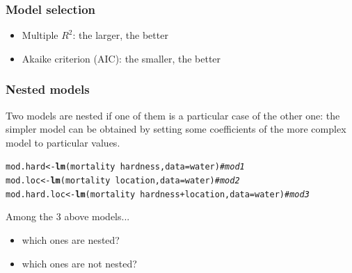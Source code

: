 \documentclass{beamer}\usepackage[]{graphicx}\usepackage[]{color}
\makeatletter
\newcommand{\hlcom}[1]{\textcolor[rgb]{0.678,0.584,0.686}{\textit{#1}}}%
\newcommand{\hlopt}[1]{\textcolor[rgb]{0,0,0}{#1}}%
\newcommand{\hlstd}[1]{\textcolor[rgb]{0.345,0.345,0.345}{#1}}%
\newcommand{\hlkwb}[1]{\textcolor[rgb]{0.69,0.353,0.396}{#1}}%
\newcommand{\hlkwc}[1]{\textcolor[rgb]{0.333,0.667,0.333}{#1}}%
\newcommand{\hlkwd}[1]{\textcolor[rgb]{0.737,0.353,0.396}{\textbf{#1}}}%
\newenvironment{kframe}{%
 \def\at@end@of@kframe{}%
 \ifinner\ifhmode%
  \def\at@end@of@kframe{\end{minipage}}%
  \begin{minipage}{\columnwidth}%
 \fi\fi%
 \def\FrameCommand##1{\hskip\@totalleftmargin \hskip-\fboxsep
 \colorbox{shadecolor}{##1}\hskip-\fboxsep
     \hskip-\linewidth \hskip-\@totalleftmargin \hskip\columnwidth}%
 \MakeFramed {\advance\hsize-\width
   \@totalleftmargin\z@ \linewidth\hsize
   \@setminipage}}%
 {\par\unskip\endMakeFramed%
 \at@end@of@kframe}
\newenvironment{knitrout}{}{} %
\makeatother
\begin{document}
{{{%

\begin{frame}[fragile]
\frametitle{Model selection}
\begin{itemize}
\item Multiple $R^2$: the larger, the better
\item Akaike criterion (AIC): the smaller, the better
\end{itemize}
\end{frame}


\begin{frame}[fragile]
\frametitle{Nested models}
Two models are nested if one of them is a particular case of the other one:
the simpler model can be obtained by setting some coefficients of the more complex
model to particular values.
\begin{knitrout}\scriptsize
{}\color{fgcolor}\begin{kframe}
\begin{alltt}
\hlstd{mod.hard} \hlkwb{<-} \hlkwd{lm}\hlstd{(mortality} \hlopt{~} \hlstd{hardness,} \hlkwc{data} \hlstd{= water)}                \hlcom{# mod 1}
\hlstd{mod.loc} \hlkwb{<-} \hlkwd{lm}\hlstd{(mortality} \hlopt{~} \hlstd{location,} \hlkwc{data} \hlstd{= water)}                 \hlcom{# mod 2}
\hlstd{mod.hard.loc} \hlkwb{<-} \hlkwd{lm}\hlstd{(mortality} \hlopt{~} \hlstd{hardness} \hlopt{+} \hlstd{location,} \hlkwc{data} \hlstd{= water)} \hlcom{# mod 3}
\end{alltt}
\end{kframe}
\end{knitrout}
Among the 3 above models...
\begin{itemize}
\item which ones are nested?
\item which ones are not nested?
\end{itemize}
\end{frame}


}}}
\end{document}
